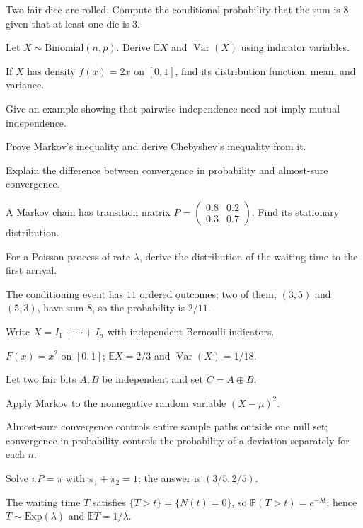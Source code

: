 \begin{chapterexercises}
    \item Two fair dice are rolled. Compute the conditional probability that the sum is $8$ given that at least one die is $3$.
    \item Let $X\sim\mathrm{Binomial}(n,p)$. Derive $\mathbb{E}X$ and $\operatorname{Var}(X)$ using indicator variables.
    \item If $X$ has density $f(x)=2x$ on $[0,1]$, find its distribution function, mean, and variance.
    \item Give an example showing that pairwise independence need not imply mutual independence.
    \item Prove Markov's inequality and derive Chebyshev's inequality from it.
    \item Explain the difference between convergence in probability and almost-sure convergence.
    \item A Markov chain has transition matrix $P=\begin{pmatrix}0.8&0.2\\0.3&0.7\end{pmatrix}$. Find its stationary distribution.
    \item For a Poisson process of rate $\lambda$, derive the distribution of the waiting time to the first arrival.
\end{chapterexercises}

\begin{selectedhints}
    \item The conditioning event has $11$ ordered outcomes; two of them, $(3,5)$ and $(5,3)$, have sum $8$, so the probability is $2/11$.
    \item Write $X=I_1+\cdots+I_n$ with independent Bernoulli indicators.
    \item $F(x)=x^2$ on $[0,1]$; $\mathbb{E}X=2/3$ and $\operatorname{Var}(X)=1/18$.
    \item Let two fair bits $A,B$ be independent and set $C=A\oplus B$.
    \item Apply Markov to the nonnegative random variable $(X-\mu)^2$.
    \item Almost-sure convergence controls entire sample paths outside one null set; convergence in probability controls the probability of a deviation separately for each $n$.
    \item Solve $\pi P=\pi$ with $\pi_1+\pi_2=1$; the answer is $(3/5,2/5)$.
    \item The waiting time $T$ satisfies $\{T>t\}=\{N(t)=0\}$, so $\mathbb{P}(T>t)=e^{-\lambda t}$; hence $T\sim\mathrm{Exp}(\lambda)$ and $\mathbb{E}T=1/\lambda$.
\end{selectedhints}
